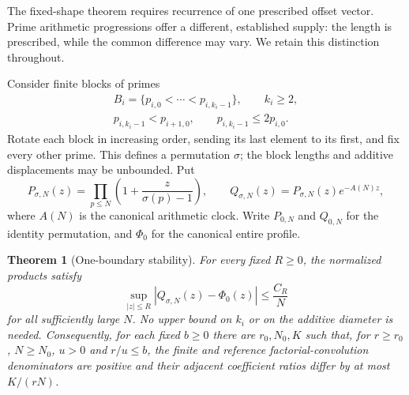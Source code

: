 \documentclass[11pt]{article}
\newtheorem{theorem}{Theorem}[section]
\theoremstyle{definition}
\begin{document}
The fixed-shape theorem requires recurrence of one prescribed offset vector.
Prime arithmetic progressions offer a different, established supply: the
length is prescribed, while the common difference may vary. We retain this
distinction throughout.

Consider finite blocks of primes
\[
 \begin{gathered}
 B_i=\{p_{i,0}<\cdots<p_{i,k_i-1}\},\qquad k_i\ge2,\\
 p_{i,k_i-1}<p_{i+1,0},\qquad p_{i,k_i-1}\le2p_{i,0}.
 \end{gathered}
\]
Rotate each block in increasing order, sending its last element to its first,
and fix every other prime. This defines a permutation $\sigma$; the block
lengths and additive displacements may be unbounded. Put
\[
 P_{\sigma,N}(z)=\prod_{p\le N}\left(1+\frac{z}{\sigma(p)-1}\right),
 \qquad Q_{\sigma,N}(z)=P_{\sigma,N}(z)e^{-A(N)z},
\]
where $A(N)$ is the canonical arithmetic clock. Write $P_{0,N}$ and $Q_{0,N}$
for the identity permutation, and $\Phi_0$ for the canonical entire profile.

\begin{theorem}[One-boundary stability]\label{thm:ordered-cycle-boundary}
For every fixed $R\ge0$, the normalized products satisfy
\[
 \sup_{|z|\le R}|Q_{\sigma,N}(z)-\Phi_0(z)|
 \le \frac{C_R}{N}
\]
for all sufficiently large $N$. No upper bound on $k_i$ or on the additive
diameter is needed. Consequently, for each fixed $b\ge0$ there are
$r_0,N_0,K$ such that, for $r\ge r_0$, $N\ge N_0$, $u>0$ and $r/u\le b$,
the finite and reference factorial-convolution denominators are positive
and their adjacent coefficient ratios differ by at most $K/(rN)$.
\end{theorem}
\end{document}
